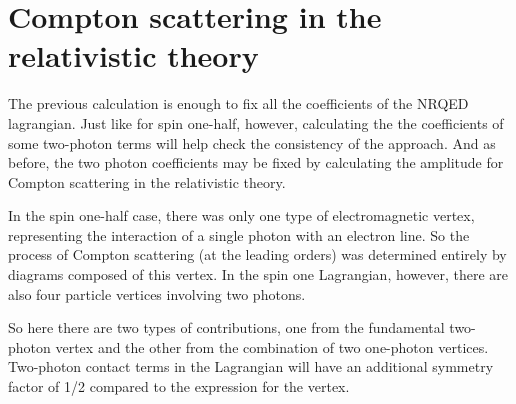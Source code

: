 \section{Compton scattering in the relativistic theory}


The previous calculation is enough to fix all the coefficients of the NRQED lagrangian.  Just like for spin one-half, however, calculating the the coefficients of some two-photon terms will help check the consistency of the approach.  And as before, the two photon coefficients may be fixed by calculating the amplitude for Compton scattering in the relativistic theory.  

In the spin one-half case, there was only one type of electromagnetic vertex, representing the interaction of a single photon with an electron line.  So the process of Compton scattering (at the leading orders) was determined entirely by diagrams composed of this vertex.  In the spin one Lagrangian, however, there are also four particle vertices involving two photons. 

So here there are two types of contributions, one from the fundamental two-photon vertex and the other from the combination of two one-photon vertices.  Two-photon contact terms in the Lagrangian will have an additional symmetry factor of 1/2 compared to the expression for the vertex. 

